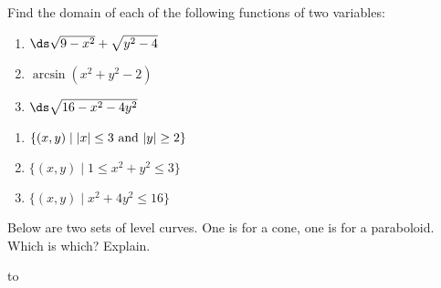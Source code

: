 \begin{enumialphparenastyle}
\begin{ex}
Find the domain of each of the following functions of two variables:
\begin{enumerate}
	\item	$\ds\sqrt{9-x^2}+\sqrt{y^2-4}$
	\item	$\arcsin(x^2+y^2-2)$
	\item	$\ds\sqrt{16-x^2-4y^2}$
\end{enumerate}
\begin{sol}
\begin{enumerate}
	\item	$\{(x,y)\mid |x|\le3\ \hbox{and}\ |y|\ge2\}$
	\item	$\{(x,y)\mid 1\le x^2+y^2\le3\}$
	\item	$\{(x,y)\mid x^2+4y^2\le16\}$
\end{enumerate}
\end{sol}
\end{ex}

\begin{ex}
Below are two sets of level curves.  One is for a cone, one
is for a paraboloid.  Which is which? Explain.

\nobreak
\hbox to 
\end{ex}

\end{enumialphparenastyle}